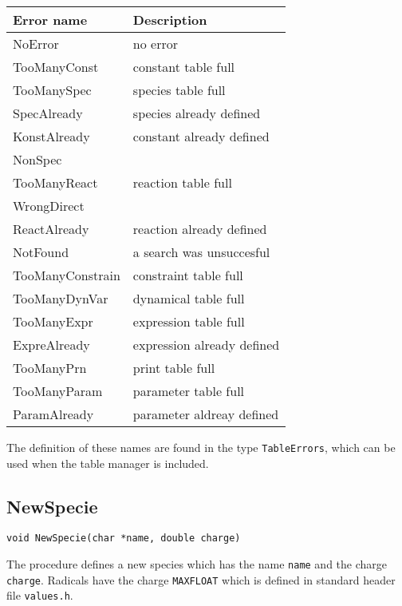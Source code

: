 \vspace{.2cm}
\begin{center}
\begin{tabular}{ll}
\hline
Error name      & Description              \\ \hline 
NoError         & no error                 \\ 
TooManyConst    & constant table full      \\ 
TooManySpec     & species table full        \\ 
SpecAlready     & species already defined   \\ 
KonstAlready    & constant already defined \\ 
NonSpec         &                          \\ 
TooManyReact    & reaction table full      \\ 
WrongDirect     &                          \\ 
ReactAlready    & reaction already defined \\ 
NotFound        & a search was unsuccesful \\ 
TooManyConstrain & constraint table full   \\ 
TooManyDynVar   & dynamical table full     \\ 
TooManyExpr     & expression table full    \\ 
ExpreAlready    & expression already defined \\ 
TooManyPrn      & print table full         \\
TooManyParam    & parameter table full     \\
ParamAlready    & parameter aldreay defined \\
\hline
\end{tabular}
\end{center}
\vspace{.2cm}

The definition of these names are found in the type {\tt TableErrors},
which can be used when the table manager is included.

\subsection{NewSpecie}
\begin{verbatim}
void NewSpecie(char *name, double charge)
\end{verbatim}

The procedure defines a new species which has the name {\tt name} 
and the charge {\tt charge}. Radicals have the
charge {\tt MAXFLOAT} which is defined in standard header file {\tt values.h}. 

